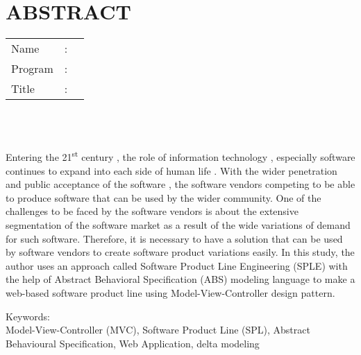 %
%

\chapter*{ABSTRACT}

\vspace*{0.2cm}

\noindent \begin{tabular}{l l p{11.0cm}}
	Name&: & \penulis \\
	Program&: & \programEng \\
	Title&: & \judulInggris \\
\end{tabular} \\ 

\vspace*{0.5cm}

\noindent 
\\ Entering the 21\textsuperscript{st} century , the role of information technology , especially software continues to expand into each side of human life . With the wider penetration and public acceptance of the software , the software vendors competing to be able to produce software that can be used by the wider community. One of the challenges to be faced by the software vendors is about the extensive segmentation of the software market as a result of the wide variations of demand for such software. Therefore, it is necessary to have a solution that can be used by software vendors to create software product variations easily. In this study, the author uses an approach called Software Product Line Engineering (SPLE) with the help of Abstract Behavioral Specification (ABS) modeling language to make a web-based software product line using Model-View-Controller design pattern.

\vspace*{0.2cm}

\noindent Keywords: \\ 
\noindent Model-View-Controller (MVC), Software Product Line (SPL), Abstract Behavioural Specification, Web Application, delta modeling\\

\newpage